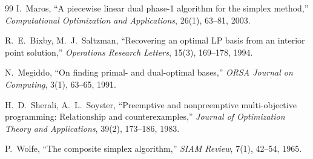 \documentclass[11pt,a4paper]{ltjsarticle}
\theoremstyle{plain}
\theoremstyle{definition}
\theoremstyle{remark}
\begin{document}
\begin{thebibliography}{99}
I.~Maros,
``A piecewise linear dual phase-1 algorithm for the simplex method,''
\textit{Computational Optimization and Applications}, 26(1), 63--81, 2003.

R.~E.~Bixby, M.~J.~Saltzman,
``Recovering an optimal LP basis from an interior point solution,''
\textit{Operations Research Letters}, 15(3), 169--178, 1994.

N.~Megiddo,
``On finding primal- and dual-optimal bases,''
\textit{ORSA Journal on Computing}, 3(1), 63--65, 1991.

H.~D.~Sherali, A.~L.~Soyster,
``Preemptive and nonpreemptive multi-objective programming: Relationship and counterexamples,''
\textit{Journal of Optimization Theory and Applications}, 39(2), 173--186, 1983.

P.~Wolfe,
``The composite simplex algorithm,''
\textit{SIAM Review}, 7(1), 42--54, 1965.

\end{thebibliography}
\end{document}
